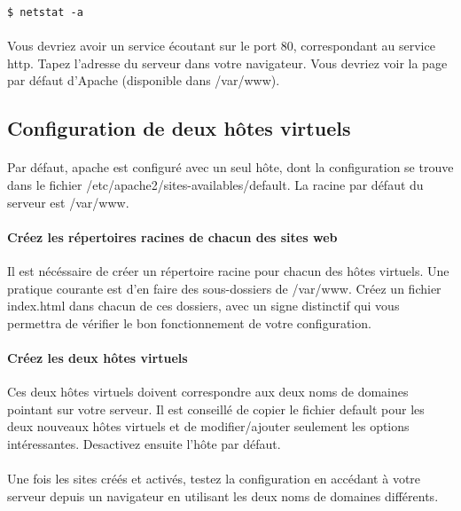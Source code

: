 \documentclass[12pt,a4paper]{article}
\begin{document}
\begin{lstlisting}
$ netstat -a
\end{lstlisting}

\paragraph{}
Vous devriez avoir un service écoutant sur le port 80, correspondant au service http. Tapez l'adresse du serveur dans votre navigateur. Vous devriez voir la page par défaut d'Apache (disponible dans /var/www).

\subsection{Configuration de deux hôtes virtuels}
\paragraph{}
Par défaut, apache est configuré avec un seul hôte, dont la configuration se trouve dans le fichier /etc/apache2/sites-availables/default. La racine par défaut du serveur est /var/www.

\paragraph{Créez les répertoires racines de chacun des sites web\\}
Il est nécéssaire de créer un répertoire racine pour chacun des hôtes virtuels. Une pratique courante est d'en faire des sous-dossiers de /var/www. Créez un fichier index.html dans chacun de ces dossiers, avec un signe distinctif qui vous permettra de vérifier le bon fonctionnement de votre configuration.

\paragraph{Créez les deux hôtes virtuels\\}
Ces deux hôtes virtuels doivent correspondre aux deux noms de domaines pointant sur votre serveur. Il est conseillé de copier le fichier default pour les deux nouveaux hôtes virtuels et de modifier/ajouter seulement les options intéressantes. Desactivez ensuite l'hôte par défaut.

\paragraph{}
Une fois les sites créés et activés, testez la configuration en accédant à votre serveur depuis un navigateur en utilisant les deux noms de domaines différents.
\end{document}
